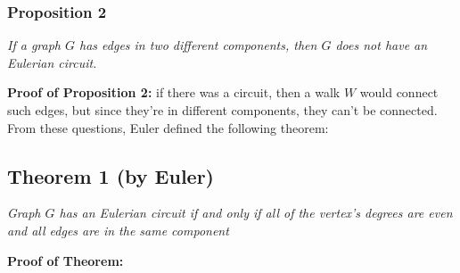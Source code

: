 \documentclass{report}
\begin{document}
\subsubsection{Proposition 2}
\begin{center}
\textit{If a graph $G$ has edges in two different components, then $G$ does not have an Eulerian circuit.}
\end{center}
\textbf{Proof of Proposition 2:} if there was a circuit, then a walk $W$ would connect such edges, but since they're in different components, they can't be connected.\\
From these questions, Euler defined the following theorem:
\subsection{Theorem 1 (by Euler)}
\begin{center}
\textit{Graph $G$ has an Eulerian circuit if and only if all of the vertex's degrees are even and all edges are in the same component}
\end{center}
\textbf{Proof of Theorem:}
\end{document}
